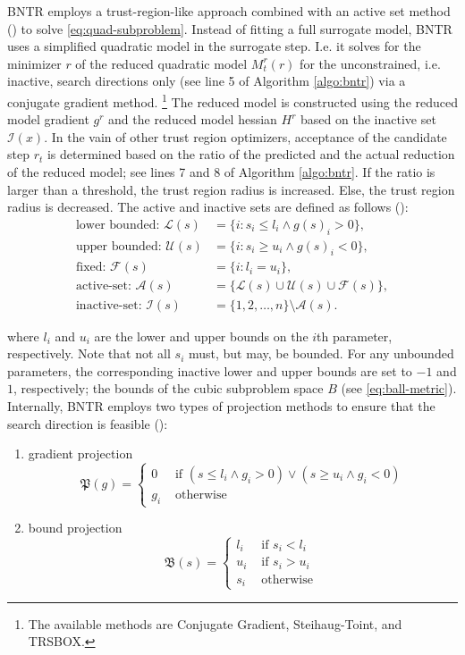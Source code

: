 BNTR employs a trust-region-like approach combined with an active set method (\cite{TAO21}) to solve \ref{eq:quad-subproblem}.
Instead of fitting a full surrogate model, BNTR uses a simplified quadratic model in the surrogate step. I.e. it solves for the minimizer $r$ of the reduced quadratic model $M^{r}_{t}(r)$ for the unconstrained, i.e. inactive, search directions only (see line 5 of Algorithm \ref{algo:bntr}) via a conjugate gradient method. \footnote{The available methods are Conjugate Gradient, Steihaug-Toint, and TRSBOX.}
The reduced model is constructed using the reduced model gradient $g^r$ and the reduced model hessian $H^r$ based on the inactive set $\mathcal{I}(x)$.
In the vain of other trust region optimizers, acceptance of the candidate step $r_t$ is determined based on the ratio of the predicted and the actual reduction of the reduced model; see lines 7 and 8 of Algorithm \ref{algo:bntr}. If the ratio is larger than a threshold, the trust region radius is increased. Else, the trust region radius is decreased.
The active and inactive sets are defined as follows (\cite{Bertsekas1982}):
\begin{align*}
\text{lower bounded: } \mathcal{L}(s) & = \{i: s_i \leq l_i \wedge g(s)_i > 0\}, \\
\text{upper bounded: } \mathcal{U}(s) & = \{i: s_i \geq u_i \wedge g(s)_i < 0\}, \\
\text{fixed: } \mathcal{F}(s) & = \{i: l_i = u_i\}, \\
\text{active-set: } \mathcal{A}(s) & = \{\mathcal{L}(s) \cup \mathcal{U}(s) \cup \mathcal{F}(s)\}, \\
\text{inactive-set: } \mathcal{I}(s) & = \{1,2,\ldots,n\} \setminus \mathcal{A}(s).
\end{align*}

\noindent where $l_i$ and $u_i$ are the lower and upper bounds on the $i$th parameter, respectively. Note that not all $s_i$ must, but may, be bounded. For any unbounded parameters, the corresponding inactive lower and upper bounds are set to $-1$ and $1$, respectively; the bounds of the cubic subproblem space $B$ (see \ref{eq:ball-metric}).
\noindent Internally, BNTR employs two types of projection methods to ensure that the search direction is feasible (\cite{TAO21}):

\begin{enumerate}
    \item gradient projection
    $$
    \mathfrak{P}(g)= \begin{cases}0 & \text { if }\left(s \leq l_i \wedge g_i>0\right) \vee\left(s \geq u_i \wedge g_i<0\right) \\ g_i & \text { otherwise }\end{cases}
    $$
    \item bound projection
    $$
    \mathfrak{B}(s)= \begin{cases}l_i & \text { if } s_i<l_i \\ u_i & \text { if } s_i>u_i \\ s_i & \text { otherwise }\end{cases}
    $$
\end{enumerate}


